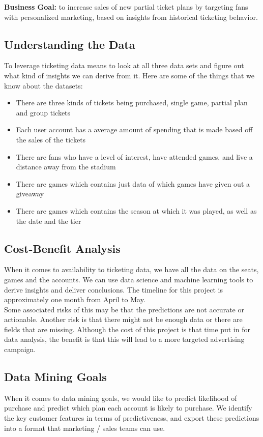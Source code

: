 \documentclass[a4paper]{article}
\begin{document}
\noindent \textbf{Business Goal:} to increase sales of new partial ticket plans by targeting fans with personalized 
marketing, based on insights from historical ticketing behavior.

\subsection{Understanding the Data}
To leverage ticketing data means to look at all three data sets and figure out what kind of insights we can derive 
from it. Here are some of the things that we know about the datasets:
\begin{itemize}
    \item There are three kinds of tickets being purchased, single game, partial plan and group tickets
    \item Each user account has a average amount of spending that is made based off the sales of the tickets
    \item There are fans who have a level of interest, have attended games, and live a distance away from the stadium
    \item There are games which contains just data of which games have given out a giveaway
    \item There are games which contains the season at which it was played, as well as the date and the tier
\end{itemize}

\subsection{Cost-Benefit Analysis}
When it comes to availability to ticketing data, we have all the data on the seats, games and the accounts. We can use
data science and machine learning tools to derive insights and deliver conclusions. The timeline for this project is
approximately one month from April to May. \\

\noindent Some associated risks of this may be that the predictions are not accurate or actionable. Another risk is 
that there might not be enough data or there are fields that are missing. Although the cost of this project is that 
time put in for data analysis, the benefit is that this will lead to a more targeted advertising campaign.

\subsection{Data Mining Goals}
When it comes to data mining goals, we would like to predict likelihood of purchase and predict which plan each 
account is likely to purchase. We identify the key customer features in terms of predictiveness, and export these 
predictions into a format that marketing / sales teams can use.
\end{document}
